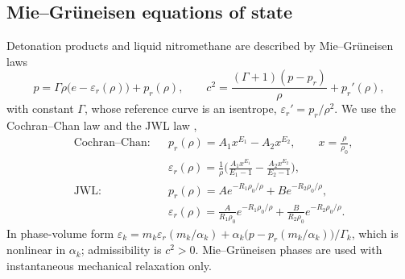 \documentclass[a4paper,fleqn]{cas-sc}
\begin{document}
\subsection{Mie--Gr\"uneisen equations of state}
\label{sec:mg}
Detonation products and liquid nitromethane are described by Mie--Gr\"un\-ei\-sen laws
\begin{equation}
p=\Gamma\rho\big(e-\varepsilon_r(\rho)\big)+p_r(\rho),\qquad c^2=\frac{(\Gamma+1)(p-p_r)}{\rho}+p_r'(\rho),
\label{eq:mg}
\end{equation}
with constant $\Gamma$, whose reference curve is an isentrope, $\varepsilon_r'=p_r/\rho^2$. We use the Cochran--Chan law
\cite{CochranChan1979} and the JWL law \cite{LeeHornigKury1968},
\begin{equation}
\begin{aligned}
&\text{Cochran--Chan:}&& p_r(\rho)=A_1x^{E_1}-A_2x^{E_2},\qquad x=\frac\rho{\rho_0},\\
&&&\varepsilon_r(\rho)=\frac1\rho\Big(\frac{A_1x^{E_1}}{E_1-1}-\frac{A_2x^{E_2}}{E_2-1}\Big),\\
&\text{JWL:}&& p_r(\rho)=Ae^{-R_1\rho_0/\rho}+Be^{-R_2\rho_0/\rho},\\
&&&\varepsilon_r(\rho)=\frac{A}{R_1\rho_0}e^{-R_1\rho_0/\rho}+\frac{B}{R_2\rho_0}e^{-R_2\rho_0/\rho}.
\end{aligned}
\label{eq:mg_ref}
\end{equation}
In phase-volume form $\varepsilon_k=m_k\varepsilon_r(m_k/\alpha_k)+\alpha_k\big(p-p_r(m_k/\alpha_k)\big)/\Gamma_k$, which is nonlinear in $\alpha_k$; admissibility
is $c^2>0$. Mie--Gr\"uneisen phases are used with instantaneous mechanical relaxation only.
\end{document}
